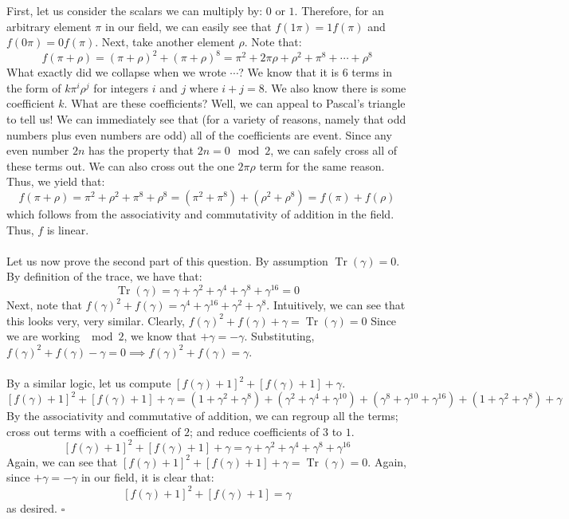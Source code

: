 \documentclass[letterpaper]{article}
\newcommand*{\QED}{\hfill\ensuremath{\square}}%
\DeclareMathOperator{\tr}{Tr}
\begin{document}
First, let us consider the scalars we can multiply by: $ 0 $ or $ 1 $.
Therefore, for an arbitrary element $ \pi $ in our field, we can easily see that $ f(1\pi) = 1 f(\pi) $ and $ f(0\pi) = 0f(\pi) $.
Next, take another element $ \rho $.
Note that:
\[
f(\pi + \rho) = {(\pi + \rho)}^2 + {(\pi + \rho)}^8 = \pi^2 + 2\pi\rho + \rho^2 + \pi^8 + \cdots + \rho^8
\]
What exactly did we collapse when we wrote $ \cdots $?
We know that it is $ 6 $ terms in the form of $ k \pi^i \rho^j $ for integers $ i $ and $ j $ where $ i + j = 8 $.
We also know there is some coefficient $ k $.
What are these coefficients?
Well, we can appeal to Pascal's triangle to tell us!
We can immediately see that (for a variety of reasons, namely that odd numbers plus even numbers are odd) all of the coefficients are event.
Since any even number $ 2n $ has the property that $ 2n = 0 \mod{2} $, we can safely cross all of these terms out.
We can also cross out the one $ 2 \pi\rho $ term for the same reason.
Thus, we yield that:
\[
f(\pi + \rho) = \pi^2 + \rho^2 + \pi^8 + \rho^8 = (\pi^2 + \pi^8) + (\rho^2 + \rho^8) = f(\pi) + f(\rho)
\]
which follows from the associativity and commutativity of addition in the field.
Thus, $ f $ is linear.
\\ \\
Let us now prove the second part of this question.
By assumption $ \tr{(\gamma)} = 0 $.
By definition of the trace, we have that:
\[
\tr{(\gamma)} = \gamma + \gamma^2 + \gamma^4 + \gamma^8 + \gamma^{16} = 0
\]
Next, note that $ {f(\gamma)}^2 + f(\gamma) = \gamma^4 + \gamma^{16} + \gamma^2 + \gamma^8 $.
Intuitively, we can see that this looks very, very similar.
Clearly, $ {f(\gamma)}^2 + f(\gamma) + \gamma = \tr{(\gamma)} = 0 $
Since we are working $ \mod{2} $, we know that $ +\gamma = -\gamma $.
Substituting, $ {f(\gamma)}^2 + f(\gamma) - \gamma = 0 \implies {f(\gamma)}^2 + f(\gamma) = \gamma $.
\\ \\
By a similar logic, let us compute $ {\left[f(\gamma) + 1 \right]}^2 + \left[f(\gamma) + 1 \right] + \gamma $.
\[
{\left[f(\gamma) + 1 \right]}^2 + \left[f(\gamma) + 1 \right] + \gamma = (1 + \gamma^2 + \gamma^8) + (\gamma^2 + \gamma^4 + \gamma^{10}) + (\gamma^8 + \gamma^{10} + \gamma^{16}) + (1 + \gamma^2 + \gamma^8) + \gamma
\]
By the associativity and commutative of addition, we can regroup all the terms; cross out terms with a coefficient of $ 2 $; and reduce coefficients of $ 3 $ to $ 1 $.
\[
{\left[f(\gamma) + 1 \right]}^2 + \left[f(\gamma) + 1 \right] + \gamma = \gamma + \gamma^2 + \gamma^4 + \gamma^8 + \gamma^{16}
\]
Again, we can see that $ {\left[f(\gamma) + 1 \right]}^2 + \left[f(\gamma) + 1 \right] + \gamma = \tr{(\gamma)} = 0 $.
Again, since $ +\gamma = -\gamma $ in our field, it is clear that:
\[
{\left[f(\gamma) + 1 \right]}^2 + \left[f(\gamma) + 1 \right] = \gamma
\]
as desired.
\QED{}
\end{document}
